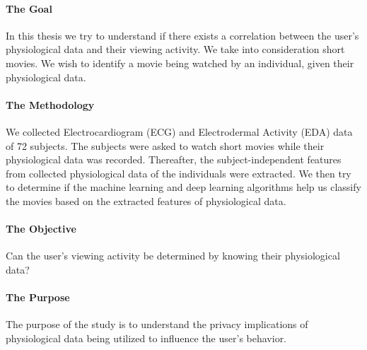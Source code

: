 \paragraph{The Goal} In this thesis we try to understand if there exists a correlation between the user's physiological data and their viewing activity. We take into consideration short movies. We wish to identify a movie being watched by an individual, given their physiological data.

\paragraph{The Methodology} \label{sec:the_methodology} We collected Electrocardiogram (ECG) and Electrodermal Activity (EDA) data of 72 subjects. The subjects were asked to watch short movies while their physiological data was recorded. Thereafter, the subject-independent features from collected physiological data of the individuals were extracted. We then try to determine if the machine learning and deep learning algorithms help us classify the movies based on the extracted features of physiological data.

\paragraph{The Objective} Can the user's viewing activity be determined by knowing their physiological data?

\paragraph{The Purpose} The purpose of the study is to understand the privacy implications of physiological data being utilized to influence the user's behavior.

